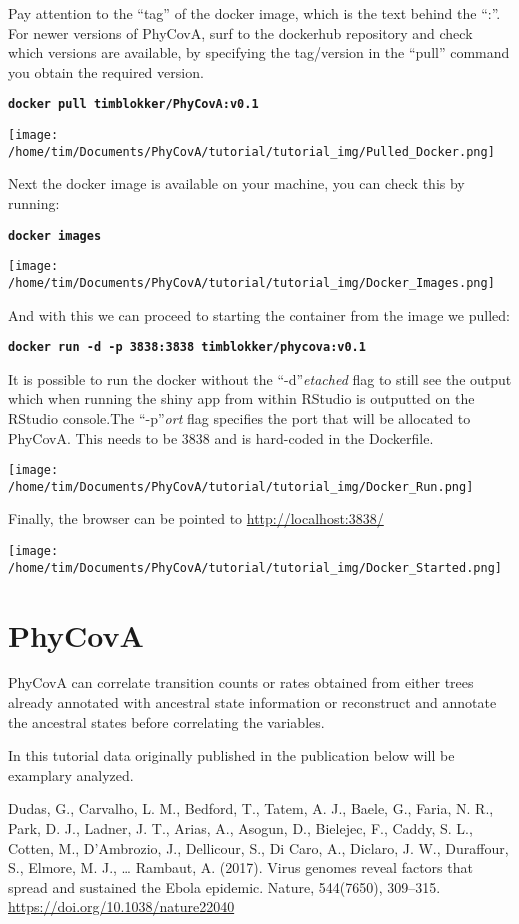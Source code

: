 \documentclass[
]{article}
\begin{document}
Pay attention to the ``tag'' of the docker image, which is the text
behind the ``:''. For newer versions of PhyCovA, surf to the dockerhub
repository and check which versions are available, by specifying the
tag/version in the ``pull'' command you obtain the required version.

\textbf{\texttt{docker\ pull\ timblokker/PhyCovA:v0.1}}

\texttt{[image: /home/tim/Documents/PhyCovA/tutorial/tutorial\_img/Pulled\_Docker.png]}

Next the docker image is available on your machine, you can check this
by running:

\textbf{\texttt{docker\ images}}

\texttt{[image: /home/tim/Documents/PhyCovA/tutorial/tutorial\_img/Docker\_Images.png]}

And with this we can proceed to starting the container from the image we
pulled:

\textbf{\texttt{docker\ run\ -d\ -p\ 3838:3838\ timblokker/phycova:v0.1}}

It is possible to run the docker without the ``-d''\emph{etached} flag
to still see the output which when running the shiny app from within
RStudio is outputted on the RStudio console.The ``-p''\emph{ort} flag
specifies the port that will be allocated to PhyCovA. This needs to be
3838 and is hard-coded in the Dockerfile.

\texttt{[image: /home/tim/Documents/PhyCovA/tutorial/tutorial\_img/Docker\_Run.png]}

Finally, the browser can be pointed to \url{http://localhost:3838/}

\texttt{[image: /home/tim/Documents/PhyCovA/tutorial/tutorial\_img/Docker\_Started.png]}

\hypertarget{phycova}{%
\section{PhyCovA}\label{phycova}}

PhyCovA can correlate transition counts or rates obtained from either
trees already annotated with ancestral state information or reconstruct
and annotate the ancestral states before correlating the variables.

In this tutorial data originally published in the publication below will
be examplary analyzed.

Dudas, G., Carvalho, L. M., Bedford, T., Tatem, A. J., Baele, G., Faria,
N. R., Park, D. J., Ladner, J. T., Arias, A., Asogun, D., Bielejec, F.,
Caddy, S. L., Cotten, M., D'Ambrozio, J., Dellicour, S., Di Caro, A.,
Diclaro, J. W., Duraffour, S., Elmore, M. J., \ldots{} Rambaut, A.
(2017). Virus genomes reveal factors that spread and sustained the Ebola
epidemic. Nature, 544(7650), 309--315.
\url{https://doi.org/10.1038/nature22040}
\end{document}
